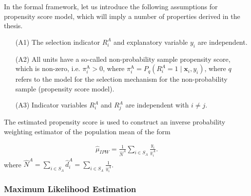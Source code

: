 \documentclass[
]{jss}
\begin{document}
In the formal framework, let us introduce the following assumptions for
propensity score model, which will imply a number of properties derived
in the thesis.

\begin{itemize}
    \item[(A1)] The selection indicator $R_i^A$ and explanatory variable $y_i$ are independent.
    \item[(A2)]All units have a so-called non-probability sample propensity score, which is non-zero, i.e. $\pi_i^{\mathrm{A}} > 0$, where $\pi_i^{\mathrm{A}} = P_q\left(R_i^A=1 \mid \boldsymbol{x}_i, y_i\right)$, where $q$ refers to the model for the selection mechanism for the non-probability sample (propensity score model).
    \item[(A3)] Indicator variables $R_i^A$ and $R_j^A$ are independent with $i \neq j$. 
\end{itemize}

The estimated propensity score is used to construct an inverse
probability weighting estimator of the population mean of the form

\begin{equation}
\begin{gathered}
\hat{\mu}_{I P W}=\frac{1}{\hat{N}^A} \sum_{i \in S_A} \frac{y_i}{\hat{\pi}_i^A}.
\end{gathered}
\end{equation} where
\(\hat{N}^A = \sum_{i \in S_A} \hat{d}_i^A = \sum_{i \in S_A} \frac{1}{\hat{\pi}_i^A}\).

\hypertarget{maximum-likelihood-estimation}{%
\subsubsection{Maximum Likelihood
Estimation}\label{maximum-likelihood-estimation}}
\end{document}

